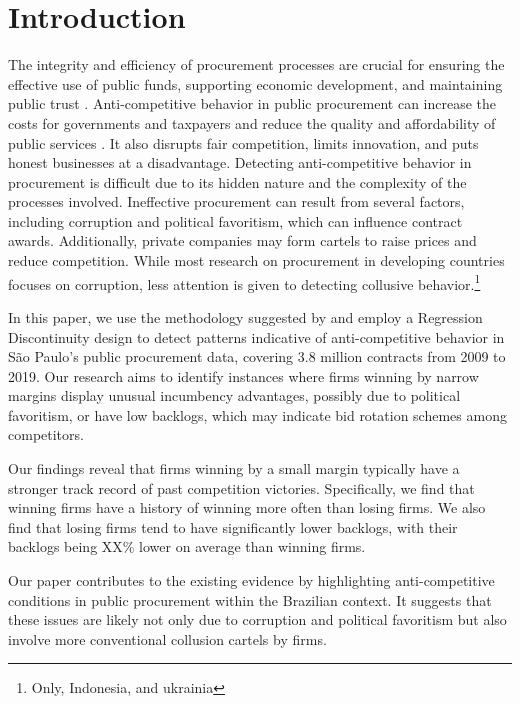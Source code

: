 \documentclass[12 pt]{elsarticle}
\begin{document}
\section{Introduction}\label{intro}
The integrity and efficiency of procurement processes are crucial for ensuring the effective use of public funds, supporting economic development, and maintaining public trust \citep{Bosio2022}. %
Anti-competitive behavior in public procurement can increase the costs for governments and taxpayers and reduce the quality and affordability of public services \citep{Sokol2017}. It also disrupts fair competition, limits innovation, and puts honest businesses at a disadvantage. 
Detecting anti-competitive behavior in procurement is difficult due to its hidden nature and the complexity of the processes involved. Ineffective procurement can result from several factors, including corruption and political favoritism, which can influence contract awards. Additionally, private companies may form cartels to raise prices and reduce competition. While most research on procurement in developing countries focuses on corruption, less attention is given to detecting collusive behavior.\footnote{Only, \cite{kawai2022study} Indonesia, \cite{baranek2021detection} and ukrainia}

In this paper, we use the methodology suggested by \cite{kawai2023using} and employ a Regression Discontinuity design to detect patterns indicative of anti-competitive behavior in São Paulo's public procurement data, covering 3.8 million contracts from 2009 to 2019. Our research aims to identify instances where firms winning by narrow margins display unusual incumbency advantages, possibly due to political favoritism, or have low backlogs, which may indicate bid rotation schemes among competitors.


Our findings reveal that firms winning by a small margin typically have a stronger track record of past competition victories. Specifically, we find that winning firms have a history of winning more often than losing firms. We also find that losing firms tend to have significantly lower backlogs, with their backlogs being XX\% lower on average than winning firms. 

Our paper contributes to the existing evidence by highlighting anti-competitive conditions in public procurement within the Brazilian context. It suggests that these issues are likely not only due to corruption and political favoritism but also involve more conventional collusion cartels by firms. 
\end{document}
